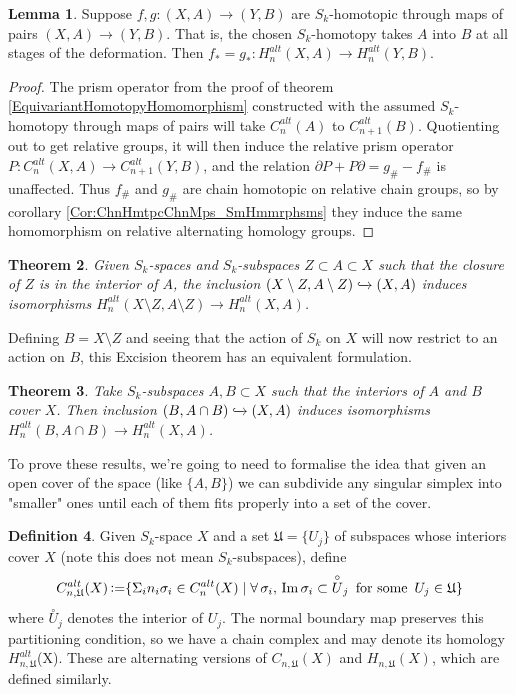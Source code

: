 \documentclass[11pt,a4paper,twoside]{article}
\theoremstyle{plain}
\newtheorem{thm}{Theorem}[subsection]
\theoremstyle{definition}
\newtheorem{defn}[thm]{Definition}
\theoremstyle{definition}
\newtheorem{lemma}[thm]{Lemma}
\theoremstyle{definition}
\theoremstyle{definition}
\theoremstyle{definition}
\DeclareMathOperator{\Ima}{Im}
\DeclareMathOperator{\coloneqq}{\vcentcolon=}
\begin{document}
\begin{lemma}\label{Lem:SkHomotopicMapsOfPairs}
Suppose $f,g\!:\!(X,A)\!\longrightarrow\!(Y,B)$ are $S_k$-homotopic through maps of pairs $(X,A)\!\rightarrow\!(Y,B)$. That is, the chosen $S_k$-homotopy takes $A$ into $B$ at all stages of the deformation. Then $f_*=g_*\!:\!H_n^{alt}(X,A)\!\longrightarrow\!H_n^{alt}(Y,B)$.
\end{lemma}
\begin{proof}
The prism operator from the proof of theorem \ref{EquivariantHomotopyHomomorphism} constructed with the assumed $S_k$-homotopy through maps of pairs will take $C_n^{alt}(A)$ to $C_{n\!+\!1}^{alt}(B)$. Quotienting out to get relative groups, it will then induce the relative prism operator $P\!:\!C_n^{alt}(X,A)\!\rightarrow\!C_{n\!+\!1}^{alt}(Y,B)$, and the relation $\partial P + P\partial=g_\#-f_\#$ is unaffected. Thus $f_\#$ and $g_\#$ are chain homotopic on relative chain groups, so by corollary \ref{Cor:ChnHmtpcChnMps_SmHmmrphsms} they induce the same homomorphism on relative alternating homology groups.
\end{proof}

\begin{thm}
Given $S_k$-spaces and $S_k$-subspaces $Z\subset A\subset X$ such that the closure of $Z$ is in the interior of $A$, the inclusion $(X\setminus Z,A\setminus Z)\xhookrightarrow{} (X,A)$ induces isomorphisms $H_n^{alt}(X\setminus Z,A\setminus Z)\longrightarrow H_n^{alt}(X,A)$.
\end{thm}

Defining $B=X\setminus Z$ and seeing that the action of $S_k$ on $X$ will now restrict to an action on $B$, this Excision theorem has an equivalent formulation.

\vspace{2mm}
\begin{thm}
\label{Thm:Excision}
Take $S_k$-subspaces $A,B\subset X$ such that the interiors of $A$ and $B$ cover $X$. Then inclusion $(B,A\cap B)\xhookrightarrow{}(X,A)$ induces isomorphisms $H_n^{alt}(B,A\cap B)\longrightarrow H_n^{alt}(X,A)$.
\end{thm}

To prove these results, we're going to need to formalise the idea that given an open cover of the space (like $\{A,B\}$) we can subdivide any singular simplex into "smaller" ones until each of them fits properly into a set of the cover.

\begin{defn}
Given $S_k$-space $X$ and a set $\mathfrak{U}=\{U_j\}$ of subspaces whose interiors cover $X$ (note this does not mean $S_k$-subspaces), define
$$C_{n,\mathfrak{U}}^{alt}(X)\coloneqq\{\Sigma_in_i\sigma_i\in C_n^{alt}(X) \mid \forall\,\sigma_i,\, \Ima{\sigma_i}\subset \overset\circ U_j \,\text{ for some }\,U_j\in\mathfrak{U}\}$$
where $\overset\circ U_j$ denotes the interior of $U_j$. The normal boundary map preserves this partitioning condition, so we have a chain complex and may denote its homology $H_{n,\mathfrak{U}}^{alt}$(X). These are alternating versions of $C_{n,\mathfrak{U}}(X)$ and $H_{n,\mathfrak{U}}(X)$, which are defined similarly.
\end{defn}
\end{document}
